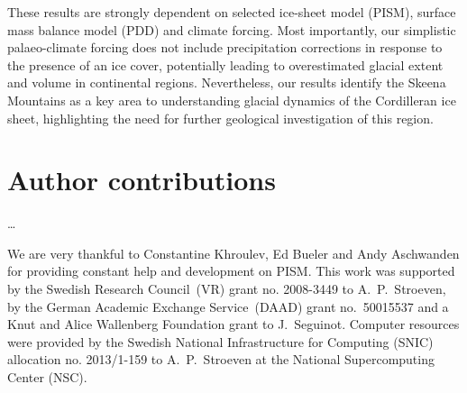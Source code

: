 \documentclass[tc, manuscript]{copernicus}
\begin{document}
These results are strongly dependent on selected ice-sheet model (PISM),
surface
mass balance model (PDD) and climate forcing. Most importantly, our simplistic
palaeo-climate forcing does not include precipitation corrections in response
to the presence of an ice cover, potentially leading to overestimated glacial
extent and volume in continental regions. Nevertheless, our results identify
the Skeena Mountains as a key area to understanding
glacial dynamics of the Cordilleran ice sheet, highlighting the need for
further geological investigation of this region.

\section*{Author contributions}
\dots

\begin{acknowledgements}
We are very thankful to Constantine Khroulev, Ed Bueler and Andy Aschwanden for
providing constant help and development on PISM. This work was supported by the
Swedish Research Council~(VR) grant no. 2008-3449 to A.~P.~Stroeven, by the
German Academic Exchange Service~(DAAD) grant no.~50015537 and a Knut and Alice
Wallenberg Foundation grant to J.~Seguinot.
Computer resources were provided by the Swedish National
Infrastructure for Computing (SNIC) allocation no. 2013/1-159 to A.~P.~Stroeven
at the National Supercomputing Center (NSC).
\end{acknowledgements}



\newpage

\end{document}
